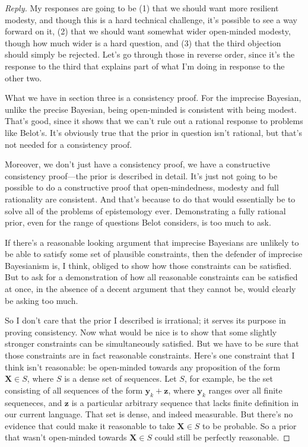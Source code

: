 \documentclass{ergoclass}
\newcommand{\vX}{\boldsymbol{X}}
\newcommand{\vy}{\boldsymbol{y}}
\newcommand{\vz}{\boldsymbol{z}}
\begin{document}
\begin{proof}[Reply]
\renewcommand{\qedsymbol}{}
My responses are going to be (1) that we should want more resilient modesty, and though this is a hard technical challenge, it's possible to see a way forward on it, (2) that we should want somewhat wider open-minded modesty, though how much wider is a hard question, and (3) that the third objection should simply be rejected. Let's go through those in reverse order, since it's the response to the third that explains part of what I'm doing in response to the other two.

What we have in section three is a consistency proof. For the imprecise Bayesian, unlike the precise Bayesian, being open-minded is consistent with being modest. That's good, since it shows that we can't rule out a rational response to problems like Belot's. It's obviously true that the prior in question isn't rational, but that's not needed for a consistency proof.

Moreover, we don't just have a consistency proof, we have a constructive consistency proof---the prior is described in detail. It's just not going to be possible to do a constructive proof that open-mindedness, modesty and full rationality are consistent. And that's because to do that would essentially be to solve all of the problems of epistemology ever. Demonstrating a fully rational prior, even for the range of questions Belot considers, is too much to ask.

If there's a reasonable looking argument that imprecise Bayesians are unlikely to be able to satisfy some set of plausible constraints, then the defender of imprecise Bayesianism is, I think, obliged to show how those constraints can be satisfied. But to ask for a demonstration of how all reasonable constraints can be satisfied at once, in the absence of a decent argument that they cannot be, would clearly be asking too much.

So I don't care that the prior I described is irrational; it serves its purpose in proving consistency. Now what would be nice is to show that some slightly stronger constraints can be simultaneously satisfied. But we have to be sure that those constraints are in fact reasonable constraints. Here's one constraint that I think isn't reasonable: be open-minded towards any proposition of the form ${\vX \in S}$, where $S$ is a dense set of sequences. Let $S$, for example, be the set consisting of all sequences of the form $\vy_k + \vz$, where $\vy_k$ ranges over all finite sequeneces, and $\vz$ is a particular arbitrary sequence that lacks finite definition in our current language. That set is dense, and indeed measurable. But there's no evidence that could make it reasonable to take $\vX \in S$ to be probable. So a prior that wasn't open-minded towards $\vX \in S$ could still be perfectly reasonable.


\end{proof}
\end{document}
